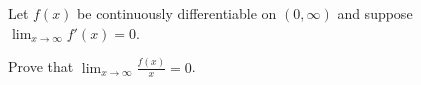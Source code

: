 Let $f(x)$ be continuously differentiable on $(0, \infty)$ and suppose
$\displaystyle{ \lim_{x \to \infty} f'(x) = 0 }$.

Prove that $\displaystyle{ \lim_{x \to \infty} \frac{f(x)}{x} = 0 }$.
